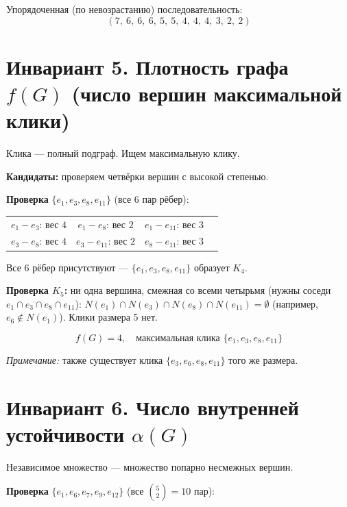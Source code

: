 \documentclass[a4paper,12pt]{article}
\begin{document}
Упорядоченная (по невозрастанию) последовательность:
\[
	\boxed{(7,\ 6,\ 6,\ 6,\ 5,\ 5,\ 4,\ 4,\ 4,\ 3,\ 2,\ 2)}
\]

\section*{Инвариант 5. Плотность графа $f(G)$ (число вершин максимальной клики)}

Клика --- полный подграф. Ищем максимальную клику.

\textbf{Кандидаты:} проверяем четвёрки вершин с высокой степенью.

\textbf{Проверка} $\{e_1, e_3, e_8, e_{11}\}$ (все 6 пар рёбер):

\begin{center}
	\begin{tabular}{cccc}
		$e_1 - e_3$: вес $4$ \checkmark    &
		$e_1 - e_8$: вес $2$ \checkmark    &
		$e_1 - e_{11}$: вес $3$ \checkmark   \\
		$e_3 - e_8$: вес $4$ \checkmark    &
		$e_3 - e_{11}$: вес $2$ \checkmark &
		$e_8 - e_{11}$: вес $3$ \checkmark   \\
	\end{tabular}
\end{center}

Все 6 рёбер присутствуют --- $\{e_1, e_3, e_8, e_{11}\}$ образует $K_4$.

\textbf{Проверка $K_5$:} ни одна вершина, смежная со всеми четырьмя
(нужны соседи $e_1 \cap e_3 \cap e_8 \cap e_{11}$):
$N(e_1) \cap N(e_3) \cap N(e_8) \cap N(e_{11}) = \emptyset$
(например, $e_6 \notin N(e_1)$). Клики размера 5 нет.

\[
	\boxed{f(G) = 4, \quad \text{максимальная клика } \{e_1, e_3, e_8, e_{11}\}}
\]

\emph{Примечание:} также существует клика $\{e_3, e_6, e_8, e_{11}\}$ того же размера.

\section*{Инвариант 6. Число внутренней устойчивости $\alpha(G)$}

Независимое множество --- множество попарно несмежных вершин.

\textbf{Проверка} $\{e_1, e_6, e_7, e_9, e_{12}\}$ (все $\binom{5}{2}=10$ пар):
\end{document}
